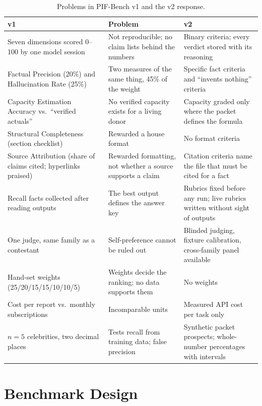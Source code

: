 \documentclass[11pt,a4paper]{article}
\begin{document}
\begin{table}[h]
\centering
\small
\caption{Problems in PIF-Bench v1 and the v2 response.}
\label{tab:v1}
\begin{tabularx}{\textwidth}{@{}>{\raggedright\arraybackslash}p{3.6cm}>{\raggedright\arraybackslash}X>{\raggedright\arraybackslash}X@{}}
\toprule
\textbf{v1} & \textbf{Problem} & \textbf{v2} \\
\midrule
Seven dimensions scored 0--100 by one model session & Not reproducible; no claim lists behind the numbers & Binary criteria; every verdict stored with its reasoning \\
Factual Precision (20\%) and Hallucination Rate (25\%) & Two measures of the same thing, 45\% of the weight & Specific fact criteria and ``invents nothing'' criteria \\
Capacity Estimation Accuracy vs.\ ``verified actuals'' & No verified capacity exists for a living donor & Capacity graded only where the packet defines the formula \\
Structural Completeness (section checklist) & Rewarded a house format & No format criteria \\
Source Attribution (share of claims cited; hyperlinks praised) & Rewarded formatting, not whether a source supports a claim & Citation criteria name the file that must be cited for a fact \\
Recall facts collected after reading outputs & The best output defines the answer key & Rubrics fixed before any run; live rubrics written without sight of outputs \\
One judge, same family as a contestant & Self-preference cannot be ruled out & Blinded judging, fixture calibration, cross-family panel available \\
Hand-set weights (25/20/15/15/10/10/5) & Weights decide the ranking; no data supports them & No weights \\
Cost per report vs.\ monthly subscriptions & Incomparable units & Measured API cost per task only \\
$n=5$ celebrities, two decimal places & Tests recall from training data; false precision & Synthetic packet prospects; whole-number percentages with intervals \\
\bottomrule
\end{tabularx}
\end{table}

\section{Benchmark Design}
\label{sec:design}
\end{document}
